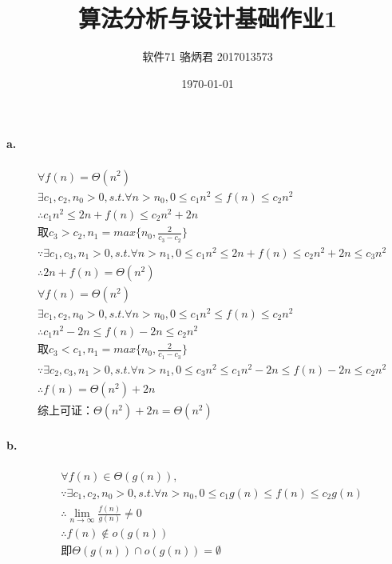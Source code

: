 \documentclass[UTF8]{ctexart}
\title{算法分析与设计基础作业1}
\author{软件71 骆炳君 2017013573}
\date{\today}
\begin{document}
\maketitle
{}

\paragraph{a.}
\begin{align*}
    &\forall f(n)=\Theta(n^2)\\
    &\exists c_1,c_2,n_0>0,s.t.\forall n>n_0,0\le c_1n^2\le f(n)\le c_2n^2\\
    &\therefore c_1n^2\le 2n+f(n) \le c_2n^2+2n\\
    &\text{取}c_3>c_2,n_1=max\{n_0,\frac{2}{c_3-c_2}\}\\
    &\because\exists c_1,c_3,n_1>0,s.t.\forall n>n_1,0\le c_1n^2\le 2n+f(n)\le c_2n^2+2n\le c_3n^2\\
    &\therefore 2n+f(n)=\Theta(n^2)\\
    &\forall f(n)=\Theta(n^2)\\
    &\exists c_1,c_2,n_0>0,s.t.\forall n>n_0,0\le c_1n^2\le f(n)\le c_2n^2\\
    &\therefore c_1n^2-2n\le f(n)-2n \le c_2n^2\\
    &\text{取}c_3<c_1,n_1=max\{n_0,\frac{2}{c_1-c_3}\}\\
    &\because\exists c_2,c_3,n_1>0,s.t.\forall n>n_1,0\le c_3n^2\le c_1n^2-2n\le f(n)-2n\le c_2n^2\\
    &\therefore f(n)=\Theta(n^2)+2n\\
    &\text{综上可证：}\Theta(n^2)+2n=\Theta(n^2)
\end{align*}

\paragraph{b.}
\begin{align*}
    &\forall f(n)\in \Theta(g(n)),\\
    &\because\exists c_1,c_2,n_0>0,s.t.\forall n>n_0,0\le c_1g(n)\le f(n)\le c_2g(n)\\
    &\therefore \lim_{n\rightarrow\infty}\frac{f(n)}{g(n)}\ne0\\
    &\therefore f(n)\notin o(g(n))\\
    &\text{即}\Theta(g(n))\cap o(g(n))=\emptyset
\end{align*}
\end{document}
